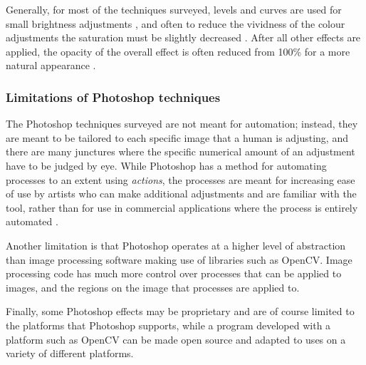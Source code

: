 \begin{longtable}{|N||c|c|c|}
\begin{minipage}{.29\textwidth}
  \end{minipage} \\
    \hline
\end{longtable}

Generally, for most of the techniques surveyed, levels and curves are used for small brightness adjustments \cite{photoshop:obama, photoshop:match_body, photoshop:match_other}, and often to reduce the vividness of the colour adjustments the saturation must be slightly decreased \cite{photoshop:obama, photoshop:match_body}. After all other effects are applied, the opacity of the overall effect is often reduced from 100\% for a more natural appearance \cite{photoshop:obama, photoshop:match_body}.

\subsubsection*{Limitations of Photoshop techniques}
The Photoshop techniques surveyed are not meant for automation; instead, they are meant to be tailored to each specific image that a human is adjusting, and there are many junctures where the specific numerical amount of an adjustment have to be judged by eye. While Photoshop has a method for automating processes to an extent using \textit{actions}, the processes are meant for increasing ease of use by artists who can make additional adjustments and are familiar with the tool, rather than for use in commercial applications where the process is entirely automated \cite{photoshop:actions}.

Another limitation is that Photoshop operates at a higher level of abstraction than image processing software making use of libraries such as OpenCV. Image processing code has much more control over processes that can be applied to images, and the regions on the image that processes are applied to. 

Finally, some Photoshop effects may be proprietary and are of course limited to the platforms that Photoshop supports, while a program developed with a platform such as OpenCV can be made open source and adapted to uses on a variety of different platforms.